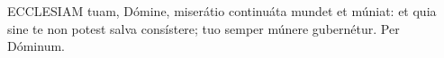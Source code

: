 


\lettrine[lines=2]{E}{CCLESIAM} tuam, Dómine, miserátio continuáta mundet et múniat: et quia sine te non potest salva consístere; tuo semper múnere gubernétur. Per Dóminum.

